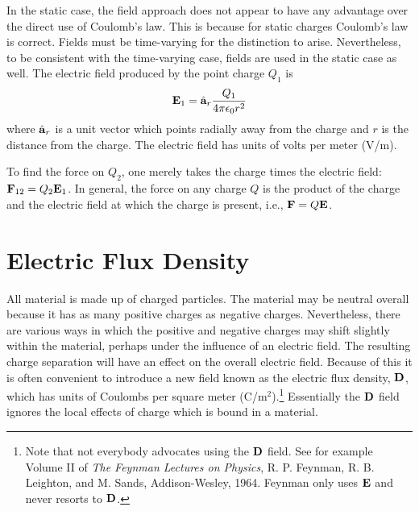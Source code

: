 In the static case, the field approach does not appear to have any
advantage over the direct use of Coulomb's law.  This is because for
static charges Coulomb's law is correct.  Fields must be time-varying
for the distinction to arise.  Nevertheless, to be consistent with the
time-varying case, fields are used in the static case as well.  The
electric field produced by the point charge $Q_1$ is
\begin{equation}
  \mathbf{E}_1 = \hat{\mathbf{a}}_{r} \frac{Q_1}{4 \pi\epsilon_0 r^2}
  \label{eq:eField}
\end{equation}
where $\hat{\mathbf{a}}_{r}$ is a unit vector which points radially away from
the charge and $r$ is the distance from the charge.  The electric
field has units of volts per meter (V/m).

To find the force on $Q_2$, one merely takes the charge times the
electric field: $\mathbf{F}_{12}=Q_2 \mathbf{E}_1$.  In general, the force
on any charge $Q$ is the product of the charge and the electric field
at which the charge is present, i.e., $\mathbf{F}=Q \mathbf{E}$.

\section{Electric Flux Density}

All material is made up of charged particles.  The material may be
neutral overall because it has as many positive charges as negative
charges.  Nevertheless, there are various ways in which the positive
and negative charges may shift slightly within the material, perhaps
under the influence of an electric field.  The resulting
charge separation will have an effect on the overall electric field.
Because of this it is often convenient to introduce a new field known
as the electric flux density, $\mathbf{D}$, which has units of Coulombs per
square meter (C/m$^2$).\footnote{Note that not everybody advocates
using the $\mathbf{D}$ field.  See for example Volume II of {\em The
Feynman Lectures on Physics}, R. P. Feynman, R. B. Leighton, and
M. Sands, Addison-Wesley, 1964.  Feynman only uses $\mathbf{E}$ and never
resorts to $\mathbf{D}$.}  Essentially the $\mathbf{D}$ field ignores the local
effects of charge which is bound in a material.

